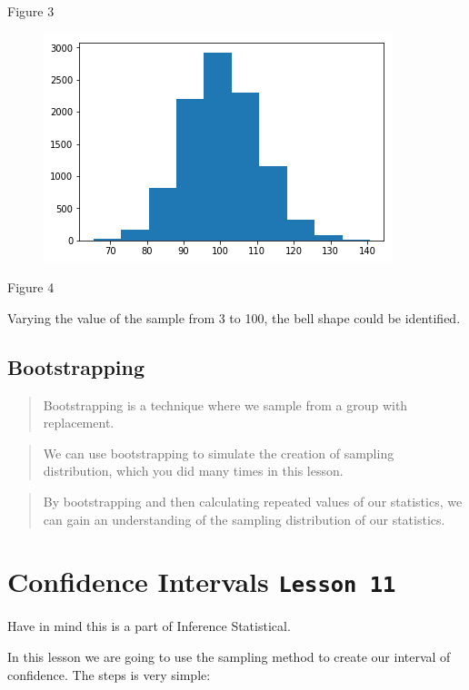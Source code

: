 \documentclass[]{book}
\begin{document}
Figure 3

\begin{figure}
\centering
\includegraphics{01-img/c4_l10_04.png}
\caption{}
\end{figure}

Figure 4

Varying the value of the sample from 3 to 100, the bell shape could be
identified.

\subsection{Bootstrapping}\label{bootstrapping}

\begin{quote}
Bootstrapping is a technique where we sample from a group with
replacement.
\end{quote}

\begin{quote}
We can use bootstrapping to simulate the creation of sampling
distribution, which you did many times in this lesson.
\end{quote}

\begin{quote}
By bootstrapping and then calculating repeated values of our statistics,
we can gain an understanding of the sampling distribution of our
statistics.
\end{quote}

\section{\texorpdfstring{Confidence Intervals
\texttt{Lesson\ 11}}{Confidence Intervals Lesson 11}}\label{confidence-intervals-lesson-11}

Have in mind this is a part of Inference Statistical.

In this lesson we are going to use the sampling method to create our
interval of confidence. The steps is very simple:
\end{document}

